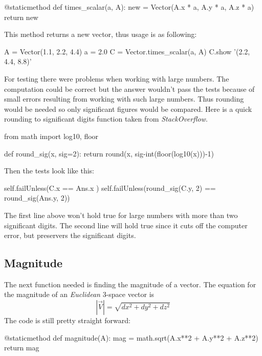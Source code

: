 \documentclass[15pt]{report}
\begin{document}
\begin{code}
@staticmethod
def times_scalar(a, A):
    new = Vector(A.x * a, 
                 A.y * a,
                 A.z * a)
    return new
\end{code}

This method returns a new vector, thus usage is as following:

\begin{code}
A = Vector(1.1, 2.2, 4.4)
a = 2.0
C = Vector.times_scalar(a, A)
C.show
'(2.2, 4.4, 8.8)'
\end{code}

For testing there were problems when working with large numbers. The computation could be correct but the answer wouldn't pass the tests because of small errors resulting from working with such large numbers. Thus rounding would be needed so only significant figures would be compared. Here is a quick rounding to significant digits function taken from \textit{StackOverflow}\cite{indgar}.

\begin{code}
from math import log10, floor

def round_sig(x, sig=2):
   return round(x, sig-int(floor(log10(x)))-1)
\end{code}

Then the tests look like this:

\begin{code}
self.failUnless(C.x == Ans.x )            
self.failUnless(round_sig(C.y, 2) == round_sig(Ans.y, 2))
\end{code}

The first line above won't hold true for large numbers with more than two significant digits. The second line will hold true since it cuts off the computer error, but preservers the significant digits.
\subsection{Magnitude} The next function needed is finding the magnitude of a vector. The equation for the magnitude of an \textit{Euclidean} 3-space vector is 
\begin{equation}
\left| \vec{V} \right|  = \sqrt{dx^2 + dy^2 + dz^2}
\end{equation}
The code is still pretty straight forward:

\begin{code}
@staticmethod
def magnitude(A):
   mag = math.sqrt(A.x**2 + A.y**2 + A.z**2)
   return mag
\end{code}
\end{document}
